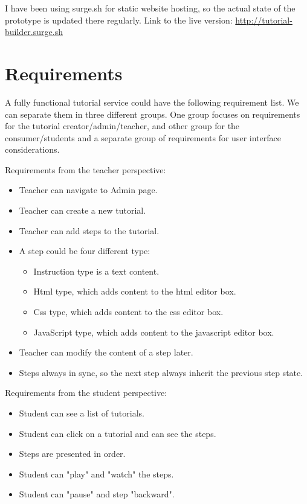 \documentclass[12pt, a4paper, oneside, openright, medskipamount]{report}
\begin{document}
I have been using surge.sh \cite{surge} for static website hosting, so the actual state of the prototype is updated there regularly. Link to the live version: \url{http://tutorial-builder.surge.sh}

\section{Requirements}

A fully functional tutorial service could have the following requirement list. We can separate them in three different groups. One group focuses on requirements for the tutorial creator/admin/teacher, and other group for the consumer/students and a separate group of requirements for user interface considerations.

\noindent Requirements from the teacher perspective:
\begin{itemize}[noitemsep]
\item Teacher can navigate to Admin page.
\item Teacher can create a new tutorial.
\item Teacher can add steps to the tutorial.
\item A step could be four different type:
\begin{itemize}[noitemsep]
\item Instruction type is a text content.
\item Html type, which adds content to the html editor box.
\item Css type, which adds content to the css editor box.
\item JavaScript type, which adds content to the javascript editor box.
\end{itemize}
\item Teacher can modify the content of a step later.
\item Steps always in sync, so the next step always inherit the previous step state.
\end{itemize}

\noindent Requirements from the student perspective:
\begin{itemize}[noitemsep]
\item Student can see a list of tutorials.
\item Student can click on a tutorial and can see the steps.
\item Steps are presented in order.
\item Student can "play" and "watch" the steps.
\item Student can "pause" and step "backward".
\end{itemize}
\end{document}
